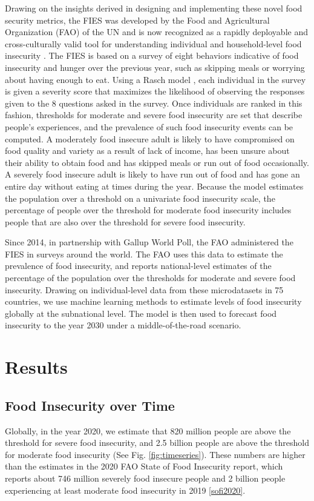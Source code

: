 \documentclass{article}
\begin{document}
Drawing on the insights derived in designing and implementing these novel food security metrics, the FIES was developed by the Food and Agricultural Organization (FAO) of the UN \cite{Ballard2013} and is now recognized as a rapidly deployable and cross-culturally valid tool for understanding individual and household-level food insecurity \citep{wambogo2018validity, smith2017world}.  The FIES is based on a survey of eight behaviors indicative of food insecurity and hunger over the previous year, such as skipping meals or worrying about having enough to eat.  Using a Rasch model \citep{Cafiero2018}, each individual in the survey is given a severity score that maximizes the likelihood of observing the responses given to the 8 questions asked in the survey.  Once individuals are ranked in this fashion, thresholds for moderate and severe food insecurity are set that describe people's experiences, and the prevalence of such food insecurity events can be computed. A moderately food insecure adult is likely to have compromised on food quality and variety as a result of lack of income, has been unsure about their ability to obtain food and has skipped meals or run out of food occasionally. A severely food insecure adult is likely to have run out of food and has gone an entire day without eating at times during the year.  Because the model estimates the population over a threshold on a univariate food insecurity scale, the percentage of people over the threshold for moderate food insecurity includes people that are also over the threshold for severe food insecurity.

Since 2014, in partnership with Gallup World Poll, the FAO administered the FIES in surveys around the world. The FAO uses this data to estimate the prevalence of food insecurity, and reports national-level estimates of the percentage of the population over the thresholds for moderate and severe food insecurity.  Drawing on individual-level data from these microdatasets in 75 countries, we use machine learning methods to estimate levels of food insecurity globally at the subnational level.  The model is then used to forecast food insecurity to the year 2030 under a middle-of-the-road scenario.

\section{Results}
\subsection{Food Insecurity over Time}
Globally, in the year 2020, we estimate that 820 million people are above the threshold for severe food insecurity, and 2.5 billion people are above the threshold for moderate food insecurity (See Fig. \ref{fig:timeseries}). These numbers are higher than the estimates in the 2020 FAO State of Food Insecurity report, which reports about 746 million severely food insecure people and 2 billion people experiencing at least moderate food insecurity in 2019 \ref{sofi2020}. 
\end{document}
